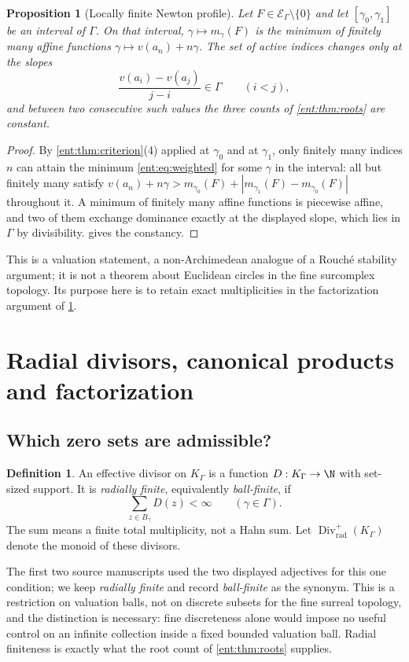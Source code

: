 \documentclass[11pt]{article}
\theoremstyle{plain}
\theoremstyle{plain}
\newtheorem{proposition}[proposition]{Proposition}
\theoremstyle{plain}
\theoremstyle{definition}
\newtheorem{definition}[definition]{Definition}
\theoremstyle{definition}
\theoremstyle{definition}
\theoremstyle{definition}
\theoremstyle{remark}
\newcommand{\K}{K_\Gamma}\newcommand{\KD}{K_\Delta}
\newcommand{\E}{\mathcal E_\Gamma}
\DeclareMathOperator{\Div}{Div}\DeclareMathOperator{\inpol}{in}
\begin{document}
\begin{proposition}[Locally finite Newton profile]\label{ent:prop:newton}
Let $F\in\E\setminus\{0\}$ and let $[\gamma_0,\gamma_1]$ be an interval of
$\Gamma$. On that interval, $\gamma\mapsto m_\gamma(F)$ is the minimum of
\emph{finitely many} affine functions $\gamma\mapsto v(a_n)+n\gamma$. The set
of active indices changes only at the slopes
\[
 \frac{v(a_i)-v(a_j)}{j-i}\in\Gamma\qquad(i<j),
\]
and between two consecutive such values the three counts of
\cref{ent:thm:roots} are constant.
\end{proposition}
\begin{proof}
By \cref{ent:thm:criterion}(4) applied at $\gamma_0$ and at $\gamma_1$, only
finitely many indices $n$ can attain the minimum \eqref{ent:eq:weighted} for
some $\gamma$ in the interval: all but finitely many satisfy
$v(a_n)+n\gamma>m_{\gamma_0}(F)+|m_{\gamma_1}(F)-m_{\gamma_0}(F)|$ throughout
it. A minimum of finitely many affine functions is piecewise affine, and two
of them exchange dominance exactly at the displayed slope, which lies in
$\Gamma$ by divisibility.  gives the constancy.
\end{proof}

This is a valuation statement, a non-Archimedean analogue of a Rouch\'e
stability argument; it is not a theorem about Euclidean circles in the fine
surcomplex topology. Its purpose here is to retain exact multiplicities in
the factorization argument of \cref{ent:sec:products}.

\section{Radial divisors, canonical products and factorization}
\label{ent:sec:products}

\subsection{Which zero sets are admissible?}
\begin{definition}\label{ent:def:radial}
An effective divisor on $\K$ is a function $D:\K\to\N$ with set-sized
support. It is \emph{radially finite}, equivalently \emph{ball-finite}, if
\[
 \sum_{z\in B_\gamma}D(z)<\infty\qquad(\gamma\in\Gamma).
\]
The sum means a finite total multiplicity, not a Hahn sum. Let
$\Div^+_{\mathrm{rad}}(\K)$ denote the monoid of these divisors.
\end{definition}

The first two source manuscripts used the two displayed adjectives for this one
condition; we keep \emph{radially finite} and record \emph{ball-finite} as
the synonym. This is a restriction on valuation balls, not on discrete
subsets for the fine surreal topology, and the distinction is necessary:
fine discreteness alone would impose no useful control on an infinite
collection inside a fixed bounded valuation ball. Radial finiteness is
exactly what the root count of \cref{ent:thm:roots} supplies.
\end{document}
